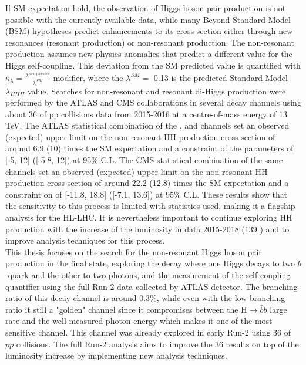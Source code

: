If SM expectation hold, the observation of Higgs boson pair production is not possible with the currently available data, while many Beyond Standard Model (BSM) hypotheses predict enhancements to its cross-section either through new resonances (resonant production) or non-resonant production. The non-resonant production assumes new physics anomalies that predict a different value for the Higgs self-coupling. This deviation from the SM predicted value is quantified with $\kappa_{\lambda} = \frac{\lambda^{new physics}}{\lambda^{SM}}$ modifier, where the $\lambda^{SM} = $ 0.13 is the predicted Standard Model $\lambda_{HHH}$ value. Searches for non-resonant and resonant di-Higgs production were performed by the ATLAS and CMS collaborations in several decay channels using about 36 \ifb of pp collisions data from 2015-2016 at a centre-of-mass energy of 13 TeV. The ATLAS statistical combination of the \bbbb, \bbtt and \bbyy channels set an observed (expected) upper limit on the non-resonant HH production cross-section of around 6.9 (10) times the SM expectation and a constraint of the \kl parameters of [-5, 12] ([-5.8, 12]) at 95\% C.L. The CMS statistical combination of the same channels set an observed (expected) upper limit on the non-resonant HH production cross-section of around 22.2 (12.8) times the SM expectation and a constraint on \kl of [-11.8, 18.8] ([-7.1, 13.6]) at 95\% C.L. These results show that the sensitivity to this process is limited with statistics used, making it a flagship analysis for the HL-LHC. It is nevertheless important to continue exploring HH production with the increase of the luminosity in data 2015-2018 (139 \ifb) and to improve analysis techniques for this process. \\

This thesis focuses on the search for the non-resonant Higgs boson pair production in the \bbyy final state, exploring the decay where one Higgs decays to two $b$-quark and the other to two photons, and the measurement of the self-coupling quantifier \kl using the full Run-2 data collected by ATLAS detector. The branching ratio of this decay channel is around 0.3\%, while even with the low branching ratio it still a "golden" channel since it compromises between the H$\to\bar{b}b$ large rate and the well-measured photon energy which makes it one of the most sensitive channel. This channel was already explored in early Run-2 using 36 \ifb of $pp$ collisions. The full Run-2 analysis aims to improve the 36 \ifb results on top of the luminosity increase by implementing new analysis techniques. \\

